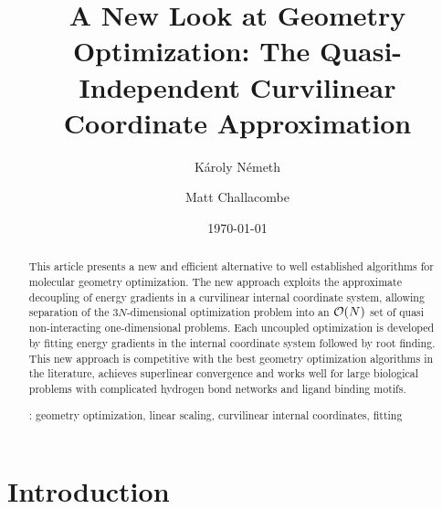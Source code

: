 \documentclass[prl,twocolumn,showpacs,twocolumngrid,superbib]{revtex4}
\begin{document}
\title{A New Look at Geometry Optimization: The Quasi- \\ 
       Independent Curvilinear Coordinate Approximation\footnotemark[1]}

\author{K\'aroly N\'emeth\footnotemark[2]}
\author{Matt Challacombe}


\date{\today}

\begin{abstract}
{
This article presents a new and efficient alternative to well established
algorithms for molecular geometry optimization.   The new approach 
exploits the approximate decoupling of energy gradients in a curvilinear 
internal coordinate system,  allowing separation  of the 3$N$-dimensional
optimization problem into an ${\cal{O}}(N)$ set of quasi non-interacting
one-dimensional problems.  Each  uncoupled optimization is developed by fitting 
energy gradients in the internal coordinate system followed by root finding.  
This new approach is competitive with the best geometry optimization algorithms 
in the literature, achieves superlinear convergence and works well for large 
biological problems with complicated hydrogen bond networks and ligand binding 
motifs.}

\smallskip
{}: 
geometry optimization, linear scaling, 
curvilinear internal coordinates, fitting
\end{abstract}

\maketitle


\section{Introduction}
\end{document}
